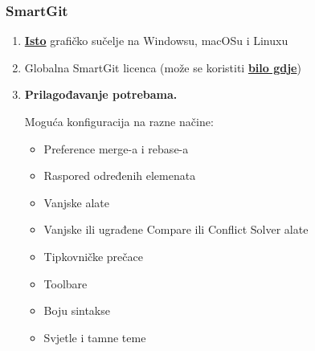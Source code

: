 \documentclass[hyperref={bookmarks=false},aspectratio=169]{beamer}
\begin{document}
\begin{frame}

\frametitle{SmartGit}

\begin{enumerate}

\item \underline{\textbf{Isto}} grafičko sučelje na Windowsu, macOSu i Linuxu
    
\item Globalna SmartGit licenca (može se koristiti  \underline{\textbf{bilo gdje}})\\
    
\item \textbf{Prilagođavanje potrebama.\\}
    
 Moguća konfiguracija na razne načine:\\
\fontsize{0.55cm}{0.4cm}\selectfont
\begin{itemize}
\item Preference merge-a i rebase-a
\item Raspored određenih elemenata
\item Vanjske alate
\item Vanjske ili ugrađene Compare ili Conflict Solver alate
\item Tipkovničke prečace
\item Toolbare
\item Boju sintakse
\item Svjetle i tamne teme
\end{itemize}

    

\end{enumerate}




\end{frame}

\end{document}
